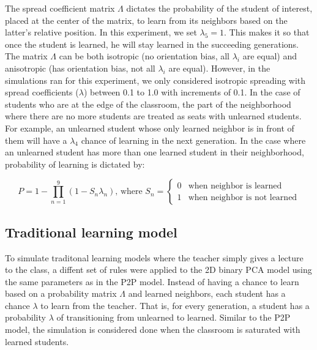 \documentclass[10pt,a4paper,twoside]{article}
\begin{document}
\noindent The spread coefficient matrix $\Lambda$ dictates the probability of the student of interest, placed at the center of the matrix, to learn from its neighbors based on the latter's relative position. In this experiment, we set $\lambda_5 = 1$. This makes it so that once the student is learned, he will stay learned in the succeeding generations. The matrix $\Lambda$ can be both isotropic (no orientation bias, all $\lambda_i$ are equal) and anisotropic (has orientation bias, not all $\lambda_i$ are equal). However, in the simulations ran for this experiment, we only considered isotropic spreading with spread coefficients ($\lambda$) between 0.1 to 1.0 with increments of 0.1.  In the case of students who are at the edge of the classroom, the part of the neighborhood where there are no more students are treated as seats with unlearned students. For example, an unlearned student whose only learned neighbor is in front of them will have a $\lambda_4$ chance of learning in the next generation. In the case where an unlearned student has more than one learned student in their neighborhood, probability of learning is dictated by:

\begin{equation}
  P = 1 - \prod_{n=1}^{9}{(1-S_n\lambda_n)}
  \text{, where } S_n=
  \begin{cases}
    0 & \text{when neighbor is learned}\\
    1 & \text{when neighbor is not learned}
  \end{cases}
  \label{eq:learning probability}
\end{equation}

\subsection{Traditional learning model}
To simulate traditonal learning models where the teacher simply gives a lecture to the class, a diffent set of rules were applied to the 2D binary PCA model using the same parameters as in the P2P model. Instead of having a chance to learn based on a probability matrix $\Lambda$ and learned neighbors, each student has a chance $\lambda$ to learn from the teacher. That is, for every generation, a student has a probability $\lambda$ of transitioning from unlearned to learned. Similar to the P2P model, the simulation is considered done when the classroom is saturated with learned students.
\end{document}
